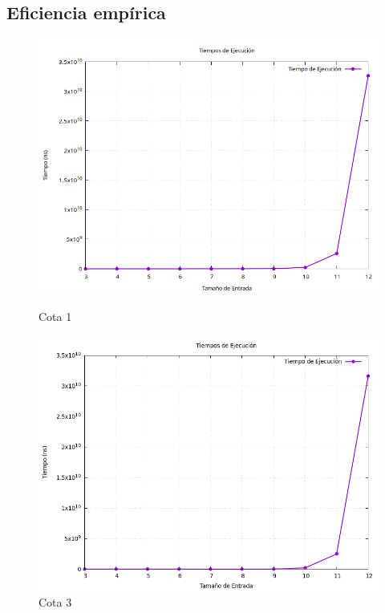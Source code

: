 \documentclass[11pt,openany]{book}
\begin{document}
\subsection{Eficiencia empírica}
\begin{figure}[H]
    \centering
    \begin{minipage}{.48\textwidth}
          \centering
          \includegraphics[width=1\linewidth]{assets/Img/grafico_tiemposbk.png}
          \caption{Cota 1}
          \label{fig:Cota 1}
    \end{minipage}%
    \begin{minipage}{.48\textwidth}
          \centering
          \includegraphics[width=1\linewidth]{assets/Img/grafico_tiempos2.png}
          \caption{Cota 3}

\end{minipage}
\end{figure}
\end{document}
